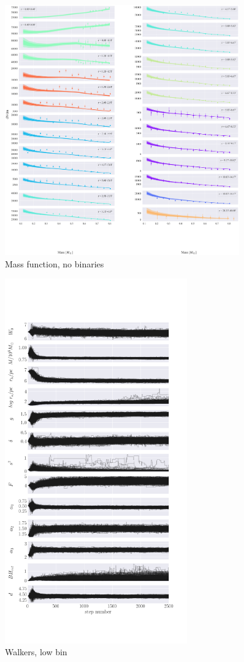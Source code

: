 \begin{figure}
	\begin{center}
		\includegraphics[width=0.9\textwidth]{figures/prev_nobin/mass_fun.png}
	\end{center}
	\caption{Mass function, no binaries}
	\label{fig:nobin_mass_fun}
\end{figure}


\begin{figure}
	\begin{center}
		\includegraphics[width=0.7\textwidth]{figures/low_bin_model/walkers.png}
	\end{center}
	\caption{Walkers, low bin}
	\label{fig:high_bin_model_densities}
\end{figure}